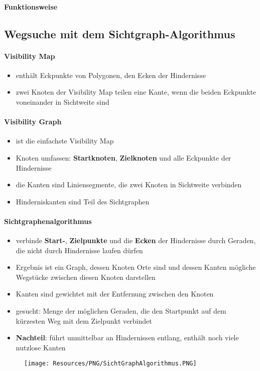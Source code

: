 \paragraph{Funktionsweise}
\subsection{Wegsuche mit dem Sichtgraph-Algorithmus}
\paragraph{Visibility Map}
\begin{itemize}
	\item enthält Eckpunkte von Polygonen, den Ecken der Hindernisse
	\item zwei Knoten der Visibility Map teilen eine Kante, wenn die beiden Eckpunkte voneinander in Sichtweite sind
\end{itemize}
\paragraph{Visibility Graph}
\begin{itemize}
	\item ist die einfachste Visibility Map
	\item Knoten umfassen: \textbf{Startknoten}, \textbf{Zielknoten} und alle Eckpunkte der Hindernisse
	\item die Kanten sind Liniensegmente, die zwei Knoten in Sichtweite verbinden
	\item Hinderniskanten sind Teil des Sichtgraphen
\end{itemize}
\paragraph{Sichtgraphenalgorithmus}
\begin{itemize}
	\item verbinde \textbf{Start-}, \textbf{Zielpunkte} und die \textbf{Ecken} der Hindernisse durch Geraden, die nicht durch Hindernisse laufen dürfen
	\item Ergebnis ist ein Graph, dessen Knoten Orte sind und dessen Kanten mögliche Wegstücke zwischen diesen Knoten darstellen
	\item Kanten sind gewichtet mit der Entfernung zwischen den Knoten
	\item gesucht: Menge der möglichen Geraden, die den Startpunkt auf dem kürzesten Weg mit dem Zielpunkt verbindet
	\item \textbf{Nachteil}: führt unmittelbar an Hindernissen entlang, enthält noch viele nutzlose Kanten
\end{itemize}
\begin{figure}[H]
	\begin{center}
		\texttt{[image: Resources/PNG/SichtGraphAlgorithmus.PNG]}
		\caption{}
		\label{fig:PNG/SichtGraphAlgorithmus.PNG}
	\end{center}
\end{figure}
